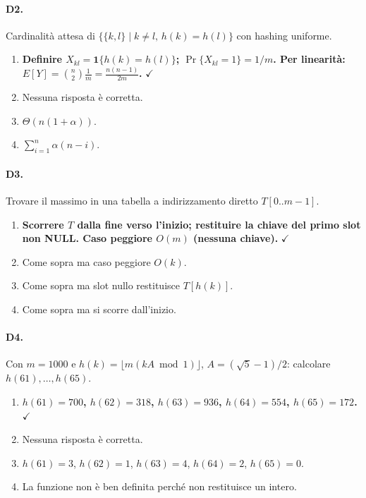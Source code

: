 \paragraph{D2.} Cardinalit\`a attesa di $\{\{k,l\}\mid k\neq l,\, h(k)=h(l)\}$ con hashing uniforme.
\begin{enumerate}[label=\Alph*.,leftmargin=*]
	\item \textcolor{correctgreen}{\textbf{Definire $X_{kl}=\mathbf{1}\{h(k)=h(l)\}$; $\Pr\{X_{kl}=1\}=1/m$. Per linearit\`a: $E[Y]=\binom{n}{2}\frac{1}{m}=\frac{n(n-1)}{2m}$.}} \hfill\textcolor{correctgreen}{$\checkmark$}
	\item Nessuna risposta \`e corretta.
	\item $\Theta(n(1+\alpha))$.
	\item $\sum_{i=1}^n \alpha(n-i)$.
\end{enumerate}

\paragraph{D3.} Trovare il massimo in una tabella a indirizzamento diretto $T[0..m-1]$.
\begin{enumerate}[label=\Alph*.,leftmargin=*]
	\item \textcolor{correctgreen}{\textbf{Scorrere $T$ dalla fine verso l'inizio; restituire la chiave del primo slot non NULL. Caso peggiore $O(m)$ (nessuna chiave).}} \hfill\textcolor{correctgreen}{$\checkmark$}
	\item Come sopra ma caso peggiore $O(k)$.
	\item Come sopra ma slot nullo restituisce $T[h(k)]$.
	\item Come sopra ma si scorre dall'inizio.
\end{enumerate}

\paragraph{D4.} Con $m=1000$ e $h(k)=\lfloor m(kA\bmod 1)\rfloor$, $A=(\sqrt{5}-1)/2$: calcolare $h(61),\ldots,h(65)$.
\begin{enumerate}[label=\Alph*.,leftmargin=*]
	\item \textcolor{correctgreen}{\textbf{$h(61)=700$, $h(62)=318$, $h(63)=936$, $h(64)=554$, $h(65)=172$.}} \hfill\textcolor{correctgreen}{$\checkmark$}
	\item Nessuna risposta \`e corretta.
	\item $h(61)=3$, $h(62)=1$, $h(63)=4$, $h(64)=2$, $h(65)=0$.
	\item La funzione non \`e ben definita perch\'e non restituisce un intero.
\end{enumerate}

